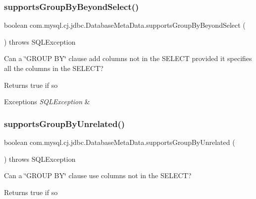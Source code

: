 \subsubsection{\texorpdfstring{supports\+Group\+By\+Beyond\+Select()}{supportsGroupByBeyondSelect()}}
{\footnotesize\ttfamily boolean com.\+mysql.\+cj.\+jdbc.\+Database\+Meta\+Data.\+supports\+Group\+By\+Beyond\+Select (\begin{DoxyParamCaption}{ }\end{DoxyParamCaption}) throws S\+Q\+L\+Exception}

Can a \char`\"{}\+G\+R\+O\+U\+P B\+Y\char`\"{} clause add columns not in the S\+E\+L\+E\+CT provided it specifies all the columns in the S\+E\+L\+E\+CT?

\begin{DoxyReturn}{Returns}
true if so 
\end{DoxyReturn}

\begin{DoxyExceptions}{Exceptions}
{\em S\+Q\+L\+Exception} & \\
\hline
\end{DoxyExceptions}
\mbox{\label{classcom_1_1mysql_1_1cj_1_1jdbc_1_1_database_meta_data_a9bcc49c4561df257fc14d5c5fec1381d}} 
\subsubsection{\texorpdfstring{supports\+Group\+By\+Unrelated()}{supportsGroupByUnrelated()}}
{\footnotesize\ttfamily boolean com.\+mysql.\+cj.\+jdbc.\+Database\+Meta\+Data.\+supports\+Group\+By\+Unrelated (\begin{DoxyParamCaption}{ }\end{DoxyParamCaption}) throws S\+Q\+L\+Exception}

Can a \char`\"{}\+G\+R\+O\+U\+P B\+Y\char`\"{} clause use columns not in the S\+E\+L\+E\+CT?

\begin{DoxyReturn}{Returns}
true if so 
\end{DoxyReturn}

